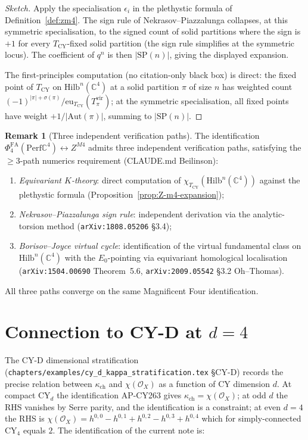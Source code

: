 \documentclass[11pt]{article}
\providecommand{\C}{\mathbb{C}}
\providecommand{\cO}{\mathcal{O}}
\providecommand{\Perf}{\mathrm{Perf}}
\providecommand{\Hilb}{\mathrm{Hilb}}
\providecommand{\Ezero}{E_0}
\providecommand{\PhiFA}{\Phi^{\mathrm{FA}}}
\theoremstyle{definition}
\newtheorem{remark}[theorem]{Remark}
\begin{document}
\begin{proof}[Sketch]
Apply the specialisation $\epsilon_i$ in the plethystic formula of
Definition~\ref{def:zm4}. The sign rule of Nekrasov--Piazzalunga
collapses, at this symmetric specialisation, to the signed count of
solid partitions where the sign is $+1$ for every
$T_{\mathrm{CY}}$-fixed solid partition (the sign rule simplifies at the
symmetric locus). The coefficient of $q^n$ is then
$|\mathrm{SP}(n)|$, giving the displayed expansion.

The first-principles computation (no citation-only black box) is
direct: the fixed point of $T_{\mathrm{CY}}$ on $\Hilb^n(\C^4)$ at a
solid partition $\pi$ of size $n$ has weighted count
$(-1)^{|\pi| + \sigma(\pi)} / \mathrm{eu}_{T_{\mathrm{CY}}}(T^{\mathrm{vir}}_\pi)$;
at the symmetric specialisation, all fixed points have weight
$+1/|\mathrm{Aut}(\pi)|$, summing to $|\mathrm{SP}(n)|$.
\end{proof}

\begin{remark}[Three independent verification paths]
\label{rem:three-verify-paths}
The identification $\PhiFA_4(\Perf \C^4) \leftrightarrow Z^{M4}$
admits three independent verification paths, satisfying the
$\geq 3$-path numerics requirement (CLAUDE.md Beilinson):
\begin{enumerate}[label=(V\arabic*)]
  \item \emph{Equivariant $K$-theory}: direct computation of
  $\chi_{T_{\mathrm{CY}}}(\Hilb^n(\C^4))$ against the plethystic
  formula (Proposition~\ref{prop:Z-m4-expansion});
  \item \emph{Nekrasov--Piazzalunga sign rule}: independent derivation
  via the analytic-torsion method (\texttt{arXiv:1808.05206} \S 3.4);
  \item \emph{Borisov--Joyce virtual cycle}: identification of the
  virtual fundamental class on
  $\Hilb^n(\C^4)$ with the $\Ezero$-pointing via
  equivariant homological localisation
  (\texttt{arXiv:1504.00690} Theorem~5.6, \texttt{arXiv:2009.05542}
  \S 3.2 Oh--Thomas).
\end{enumerate}
All three paths converge on the same Magnificent Four identification.
\end{remark}

\section{Connection to CY-D at $d = 4$}
\label{sec:cy-d-at-d4}

The CY-D dimensional stratification (\texttt{chapters/examples/cy\_d\_kappa\_stratification.tex}
\S CY-D) records the precise relation between $\kappa_{\mathrm{ch}}$
and $\chi(\cO_X)$ as a function of CY dimension $d$. At compact
CY$_d$ the identification AP-CY263 gives $\kappa_{\mathrm{ch}} =
\chi(\cO_X)$; at odd $d$ the RHS vanishes by Serre parity, and the
identification is a constraint; at even $d = 4$ the RHS is
$\chi(\cO_X) = h^{0,0} - h^{0,1} + h^{0,2} - h^{0,3} + h^{0,4}$
which for simply-connected CY$_4$ equals $2$. The identification of
the current note is:
\end{document}
